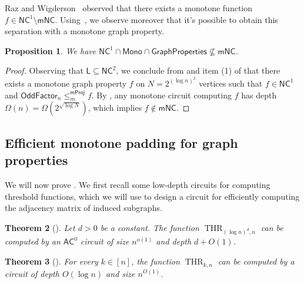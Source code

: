 \documentclass[10pt,a4paper]{article}
\newtheorem{theorem}{Theorem}[section]
\newtheorem{proposition}[theorem]{Proposition}
\newcommand{\complexityfont}[1]{\mathsf{#1}}
\newcommand{\monclass}[1]{\mathsf{m}#1}
\def\mNC          {\monclass{\NC}}
\def\AC           {\complexityfont{AC}}
\def\NC           {\complexityfont{NC}}
\renewcommand{\L} {\complexityfont{L}}
\newcommand{\semMon}[1]{#1 \cap \monfns}
\newcommand{\monfns}{\mathsf{Mono}}
\newcommand{\GraphPpts}{\mathsf{GraphProperties}}
\def\sseq{\subseteq}
\def\sm{\setminus}
\DeclareMathOperator{\thr}{THR}
\newcommand{\OddFactor}{\mathsf{OddFactor}}
\newcommand{\mprojred}{\leq^{\mathsf{mProj}}_m}
\begin{document}
Raz and Wigderson~\cite{RW92} observed that there exists a monotone function
$f \in \NC^1 \sm \mNC$.
Using~,
we observe moreover that it's possible to obtain this separation
with a monotone graph property.

\begin{proposition}
    \label{prop:nc1-mnc-graph}
    We have $\semMon{\NC^1} \cap \GraphPpts \not\sseq \mNC$.
\end{proposition}
\begin{proof}
    Observing that $\L \sseq \NC^2$,
    we conclude 
    from
    and item (1) of 
    that
    there exists a monotone graph property $f$
    on 
    $N = 2^{(\log n)^2}$ 
    vertices
    such that 
    $f \in \NC^1$
    and 
    $\OddFactor_n \mprojred f$.
    By 
    ,
    any monotone circuit computing $f$
    has depth 
    $\Omega(n) = \Omega(2^{\sqrt{\log N}})$,
    which implies $f \not\in \mNC$.
    \qedhere
\end{proof}


\subsection{Efficient monotone padding for graph properties}

We will now prove .
We first recall some low-depth circuits
for computing threshold functions, which we will use to design a circuit for efficiently computing
the adjacency matrix of induced subgraphs.





\begin{theorem}[\cite{hwwy94}]
    \label{thm:polylog-thr-ac0}
Let $d > 0$ be a constant.
The function
$\thr_{(\log n)^d,n}$ 
can be computed by an $\AC^0$ circuit of size $n^{o(1)}$
and depth $d+O(1)$.
\end{theorem}

\begin{theorem}[\cite{aks83}]
    \label{thm:thr-nc1}
    For every $k \in [n]$,
    the function $\thr_{k,n}$ can be computed by a
    circuit of depth $O(\log n)$ and size
    $n^{O(1)}$.
\end{theorem}
\end{document}
